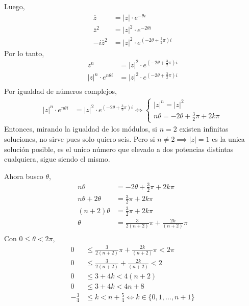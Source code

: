 Luego,
\begin{align*}
    \overline{z} &= |z|\cdot e^{-\theta i} \\
    \overline{z}^2 &= |z|^2 \cdot e^{-2 \theta i} \\
    -i\overline{z}^2 &= |z|^2 \cdot e^{\left(-2 \theta + \frac{3}{2}\pi\right) i}
\end{align*}
Por lo tanto, 
\begin{align*}
    z^n &= |z|^2 \cdot e^{\left(-2 \theta + \frac{3}{2}\pi\right) i} \\
    |z|^n\cdot e^{n\theta i} &= |z|^2 \cdot e^{\left(-2 \theta + \frac{3}{2}\pi\right) i} \\
\end{align*}
Por igualdad de números complejos,
\begin{align*}
    |z|^n\cdot e^{n\theta i} &= |z|^2 \cdot e^{\left(-2 \theta + \frac{3}{2}\pi\right) i} \iff  \begin{cases}
        |z|^n = |z|^2 \\
        n\theta = -2 \theta + \frac{3}{2}\pi + 2k\pi
    \end{cases}
\end{align*}
Entonces, mirando la igualdad de los módulos, si $ n = 2 $ existen infinitas soluciones, no sirve pues solo quiero seis.
Pero si $ n \neq 2 \implies |z| = 1$ es la unica solución posible, es el unico número que elevado a dos potencias distintas cualquiera, sigue siendo el mismo.

Ahora busco $ \theta $,
\begin{align*}
    n\theta &= -2 \theta + \frac{3}{2}\pi + 2k\pi \\
    n\theta + 2 \theta &= \frac{3}{2}\pi + 2k\pi \\
    (n+2)\theta &= \frac{3}{2}\pi + 2k\pi \\
    \theta &= \frac{3}{2(n+2)}\pi + \frac{2k}{(n+2)}\pi \\
\end{align*}
Con $ 0 \leq \theta < 2\pi $,
\begin{align*}
    0 &\leq \frac{3}{2(n+2)}\pi + \frac{2k}{(n+2)}\pi < 2\pi \\
    0 &\leq \frac{3}{2(n+2)} + \frac{2k}{(n+2)} < 2 \\
    0 &\leq 3 + 4k < 4(n+2) \\
    0 &\leq 3 + 4k < 4n+8 \\
    -\frac{3}{4} &\leq k < n + \frac{5}{4} \iff k \in \{ 0,1,...,n+1 \}
\end{align*}

